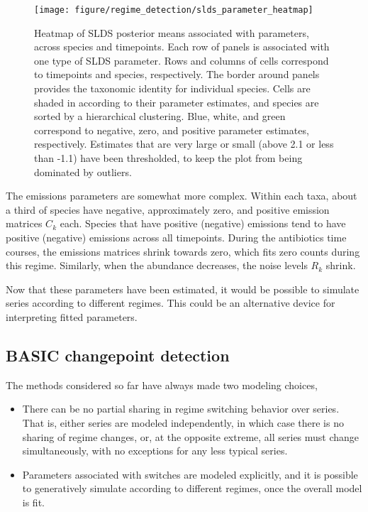 \begin{figure}
  \centering
  \texttt{[image: figure/regime\_detection/slds\_parameter\_heatmap]}
  \caption{Heatmap of SLDS posterior means associated with parameters, across
    species and timepoints. Each row of panels is associated with one type of
    SLDS parameter. Rows and columns of cells correspond to timepoints and
    species, respectively. The border around panels provides the taxonomic
    identity for individual species. Cells are shaded in according to their
    parameter estimates, and species are sorted by a hierarchical clustering.
    Blue, white, and green correspond to negative, zero, and positive parameter
    estimates, respectively. Estimates that are very large or small (above 2.1
    or less than -1.1) have been thresholded, to keep the plot from being
    dominated by outliers. \label{fig:slds_parameter_heatmap}
  }
\end{figure}

The emissions parameters are somewhat more complex. Within each taxa, about a
third of species have negative, approximately zero, and positive emission
matrices $C_{k}$ each. Species that have positive (negative) emissions tend to
have positive (negative) emissions across all timepoints. During the antibiotics
time courses, the emissions matrices shrink towards zero, which fits zero counts
during this regime. Similarly, when the abundance decreases, the noise levels
$R_k$ shrink.

Now that these parameters have been estimated, it would be possible to simulate
series according to different regimes. This could be an alternative device for
interpreting fitted parameters.

\subsection{BASIC changepoint detection}

The methods considered so far have always made two modeling choices,
\begin{itemize}
\item There can be no partial sharing in regime switching behavior over series.
  That is, either series are modeled independently, in which case there is no
  sharing of regime changes, or, at the opposite extreme, all series must change
  simultaneously, with no exceptions for any less typical series.
\item Parameters associated with switches are modeled explicitly, and it is
  possible to generatively simulate according to different regimes, once the
  overall model is fit.
\end{itemize}

